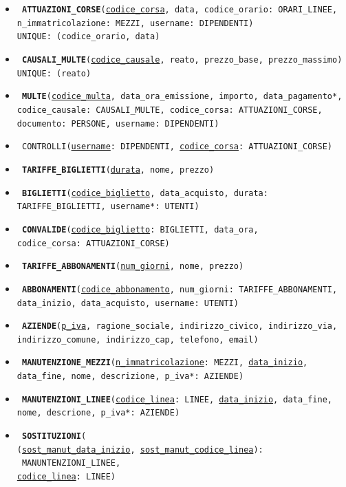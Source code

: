 \documentclass[12pt,a4paper]{report}
\begin{document}
\begin{itemize}
{    UNIQUE: (codice\_linea, ora\_partenza, giorno\_settimanale)
}
\item\texttt{
    \textbf{ATTUAZIONI\_CORSE}(\underline{codice\_corsa}, data, codice\_orario: ORARI\_LINEE, \\n\_immatricolazione: MEZZI, username: DIPENDENTI)\\
    UNIQUE: (codice\_orario, data)
}
\item\texttt{
    \textbf{CAUSALI\_MULTE}(\underline{codice\_causale}, reato, prezzo\_base, prezzo\_massimo)\\
    UNIQUE: (reato)
}
\item\texttt{
    \textbf{MULTE}(\underline{codice\_multa}, data\_ora\_emissione, importo, data\_pagamento*, \\codice\_causale: CAUSALI\_MULTE, codice\_corsa: ATTUAZIONI\_CORSE, \\documento: PERSONE, username: DIPENDENTI)
}
\item\texttt{
    CONTROLLI(\underline{username}: DIPENDENTI, \underline{codice\_corsa}: ATTUAZIONI\_CORSE)
}
\item\texttt{
    \textbf{TARIFFE\_BIGLIETTI}(\underline{durata}, nome, prezzo)
}
\item\texttt{
    \textbf{BIGLIETTI}(\underline{codice\_biglietto}, data\_acquisto, durata: TARIFFE\_BIGLIETTI, username*: UTENTI)
}
\item\texttt{
    \textbf{CONVALIDE}(\underline{codice\_biglietto}: BIGLIETTI, data\_ora, \\codice\_corsa: ATTUAZIONI\_CORSE)
}
\item\texttt{
    \textbf{TARIFFE\_ABBONAMENTI}(\underline{num\_giorni}, nome, prezzo)
}
\item\texttt{
    \textbf{ABBONAMENTI}(\underline{codice\_abbonamento}, num\_giorni: TARIFFE\_ABBONAMENTI, \\data\_inizio, data\_acquisto, username: UTENTI)
}
\item\texttt{
    \textbf{AZIENDE}(\underline{p\_iva}, ragione\_sociale, indirizzo\_civico, indirizzo\_via, \\indirizzo\_comune, indirizzo\_cap, telefono, email)
}
\item\texttt{
    \textbf{MANUTENZIONE\_MEZZI}(\underline{n\_immatricolazione}: MEZZI, \underline{data\_inizio}, data\_fine, nome, descrizione, p\_iva*: AZIENDE)
}
\item\texttt{
    \textbf{MANUTENZIONI\_LINEE}(\underline{codice\_linea}: LINEE, \underline{data\_inizio}, data\_fine, nome, descrione, p\_iva*: AZIENDE)
}
\item\texttt{
    \textbf{SOSTITUZIONI}(\\(\underline{sost\_manut\_data\_inizio}, \underline{sost\_manut\_codice\_linea}): \ MANUNTENZIONI\_LINEE, \\\underline{codice\_linea}: LINEE)
}
\end{itemize}
\end{document}
